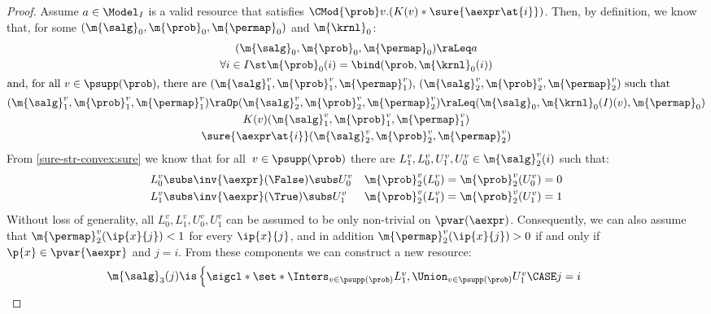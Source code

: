 \documentclass[acmsmall,nonacm,screen,appendix]{acmart}
\begin{document}
\begin{proof}
  Assume $a \in \Model_I$ is a valid resource that
  satisfies $\CMod{\prob} v. (K(v) \ast  \sure{\aexpr\at{i}})$.
  Then, by definition, we know that,
  for some $ (\m{\salg}_0, \m{\prob}_0, \m{\permap}_0) $ and $\m{\krnl}_0$:
  \begin{gather}
    (\m{\salg}_0, \m{\prob}_0, \m{\permap}_0) \raLeq a
    \label{sure-str-convex:a}
    \\
    \forall i\in I\st
       \m{\prob}_0(i) = \bind(\prob, \m{\krnl}_0(i))
    \label{sure-str-convex:bind-a}
    \\
    \intertext{and, for all $v \in \psupp(\prob)$, there are
      $(\m{\salg}^v_1, \m{\prob}^v_1, \m{\permap}^v_1)$,
      $(\m{\salg}^v_2, \m{\prob}^v_2, \m{\permap}^v_2)$
      such that}
(\m{\salg}^v_1, \m{\prob}^v_1, \m{\permap}^v_1)
    \raOp
    (\m{\salg}^v_2, \m{\prob}^v_2, \m{\permap}^v_2)
    \raLeq
      (\m{\salg}_0, \m{\krnl}_0(I)(v), \m{\permap}_0)
    \label{sure-str-convex:star}
    \\
    K(v)(\m{\salg}^v_1, \m{\prob}^v_1, \m{\permap}^v_1)
    \label{sure-str-convex:K}
    \\
    \sure{\aexpr\at{i}}(\m{\salg}^v_2, \m{\prob}^v_2, \m{\permap}^v_2)
    \label{sure-str-convex:sure}
  \end{gather}
  From \eqref{sure-str-convex:sure} we know that for all~$v \in \psupp(\prob)$
  there are $L^v_1,L^v_0,U^v_1,U^v_0 \in \m{\salg}^v_2(i)$ such that:
  \begin{align*}
    L^v_0 &\subs \inv{\aexpr}(\False) \subs U^v_0
    &
    \m{\prob}^v_2(L^v_0) &= \m{\prob}^v_2(U^v_0) = 0
    \\
    L^v_1 &\subs \inv{\aexpr}(\True) \subs U^v_1
    &
    \m{\prob}^v_2(L^v_1) &= \m{\prob}^v_2(U^v_1) = 1
  \end{align*}
  Without loss of generality, all $L^v_0, L^v_1, U^v_0, U^v_1$ can be assumed
  to be only non-trivial on $\pvar(\aexpr)$.
  Consequently, we can also assume that
  $\m{\permap}^v_2(\ip{x}{j})<1$ for every $\ip{x}{j}$,
and in addition
  $\m{\permap}^v_2(\ip{x}{j})>0$
  if and only if $\p{x}\in \pvar{\aexpr}$ and $j=i$.
  From these components we can construct a new resource:
  \begin{align*}
    \m{\salg}_3(j) &\is
      \begin{cases}
        \sigcl*{\set*{
          \Inters_{v \in \psupp(\prob)} L^v_1,
          \Union_{v \in \psupp(\prob)} U^v_1
        }}
        \CASE j  =  i \\

\end{cases}
\end{align*}
\end{proof}
\end{document}
